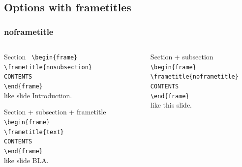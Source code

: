 \documentclass[aspectratio=169]{beamer}
\begin{document}
\begin{frame}[plain, default, backgroundpicture=fig/scq_berenguela]


\end{frame}




\subsection{Options with frametitles}
\begin{frame}[default]
\frametitle{noframetitle}
\vspace*{-0.6cm}
\begin{columns}[t]
  \begin{column}{0.48\textwidth}
    \begin{block}{Section}
      \texttt{%
      \textbackslash begin\{frame\}\\%
      \textbackslash frametitle\{nosubsection\}\\
      CONTENTS\\%
      \textbackslash end\{frame\}%
      }\\
      like slide Introduction.
    \end{block}
    \begin{block}{Section + subsection + frametitle}
      \texttt{%
      \textbackslash begin\{frame\}\\%
      \textbackslash frametitle\{text\}\\
      CONTENTS\\%
      \textbackslash end\{frame\}%
      }\\
      like slide BLA.
    \end{block}
  \end{column}
  \begin{column}{0.48\textwidth}
    \begin{block}{Section + subsection}
      \texttt{%
      \textbackslash begin\{frame\}\\%
      \textbackslash frametitle\{noframetitle\}\\
      CONTENTS\\%
      \textbackslash end\{frame\}%
      }\\
      like this slide.
    \end{block}

\end{column}
\end{columns}
\end{frame}
\end{document}
